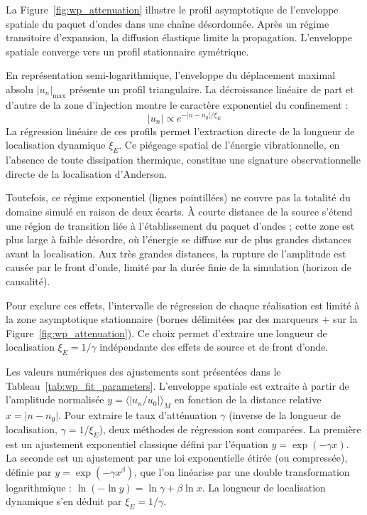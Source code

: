 \documentclass[11pt, a4paper, twoside]{article}
\begin{document}
La Figure~\ref{fig:wp_attenuation} illustre le profil asymptotique de l'enveloppe spatiale du paquet d'ondes dans une chaîne désordonnée. Après un régime transitoire d'expansion, la diffusion élastique limite la propagation. L'enveloppe spatiale converge vers un profil stationnaire symétrique.

En représentation semi-logarithmique, l'enveloppe du déplacement maximal absolu $|u_n|_{\max}$ présente un profil triangulaire. La décroissance linéaire de part et d'autre de la zone d'injection montre le caractère exponentiel du confinement :
\begin{equation}\label{eq:exponential_decay_wp}
    |u_n| \propto e^{-|n-n_0|/\xi_E}
\end{equation}
La régression linéaire de ces profils permet l'extraction directe de la longueur de localisation dynamique $\xi_E$. Ce piégeage spatial de l'énergie vibrationnelle, en l'absence de toute dissipation thermique, constitue une signature observationnelle directe de la localisation d'Anderson.

Toutefois, ce régime exponentiel (lignes pointillées) ne couvre pas la totalité du domaine simulé en raison de deux écarts. À courte distance de la source s'étend une région de transition liée à l'établissement du paquet d'ondes ; cette zone est plus large à faible désordre, où l'énergie se diffuse sur de plus grandes distances avant la localisation. Aux très grandes distances, la rupture de l'amplitude est causée par le front d'onde, limité par la durée finie de la simulation (horizon de causalité).

Pour exclure ces effets, l'intervalle de régression de chaque réalisation est limité à la zone asymptotique stationnaire (bornes délimitées par des marqueurs $+$ sur la Figure~\ref{fig:wp_attenuation}). Ce choix permet d'extraire une longueur de localisation $\xi_E = 1/\gamma$ indépendante des effets de source et de front d'onde.

Les valeurs numériques des ajustements sont présentées dans le Tableau~\ref{tab:wp_fit_parameters}. L'enveloppe spatiale est extraite à partir de l'amplitude normalisée $y = \langle |u_n/u_0| \rangle_M$ en fonction de la distance relative $x = |n - n_0|$. Pour extraire le taux d'atténuation $\gamma$ (inverse de la longueur de localisation, $\gamma = 1/\xi_E$), deux méthodes de régression sont comparées. La première est un ajustement exponentiel classique défini par l'équation $y = \exp(-\gamma x)$. La seconde est un ajustement par une loi exponentielle étirée (ou compressée), définie par $y = \exp(-\gamma x^\beta)$, que l'on linéarise par une double transformation logarithmique : $\ln(-\ln y) = \ln \gamma + \beta \ln x$. La longueur de localisation dynamique s'en déduit par $\xi_E = 1/\gamma$.
\end{document}
